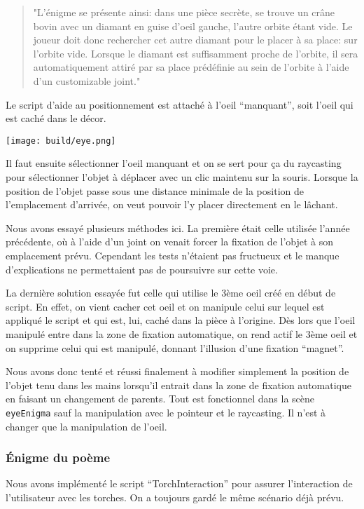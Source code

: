 \documentclass[12pt]{article}
\begin{document}
\begin{quote}
    "L’énigme se présente ainsi: dans une pièce secrète, se trouve un crâne bovin avec un diamant en guise d’oeil gauche, l’autre orbite étant vide. Le joueur doit donc rechercher cet autre diamant pour le placer à sa place: sur l’orbite vide. Lorsque le diamant est suffisamment proche de l’orbite, il sera automatiquement attiré par sa place prédéfinie au sein de l’orbite à l’aide d’un customizable joint."
\end{quote}

Le script d’aide au positionnement est attaché à l’oeil “manquant”, soit l’oeil qui est caché dans le décor.

\begin{center}
    \texttt{[image: build/eye.png]}
\end{center}

Il faut ensuite sélectionner l’oeil manquant et on se sert pour ça du raycasting pour sélectionner l’objet à déplacer avec un clic maintenu sur la souris. Lorsque la position de l’objet passe sous une distance minimale de la position de l'emplacement d’arrivée, on veut pouvoir l’y placer directement en le lâchant.

Nous avons essayé plusieurs méthodes ici. La première était celle utilisée l’année précédente, où à l’aide d’un joint on venait forcer la fixation de l’objet à son emplacement prévu. Cependant les tests n’étaient pas fructueux et le manque d’explications ne permettaient pas de poursuivre sur cette voie.

La dernière solution essayée fut celle qui utilise le 3ème oeil créé en début de script. En effet, on vient cacher cet oeil et on manipule celui sur lequel est appliqué le script et qui est, lui, caché dans la pièce à l’origine. Dès lors que l’oeil manipulé entre dans la zone de fixation automatique, on rend actif le 3ème oeil et on supprime celui qui est manipulé, donnant l’illusion d’une fixation “magnet”.

Nous avons donc tenté et réussi finalement à modifier simplement la position de l’objet tenu dans les mains lorsqu’il entrait dans la zone de fixation automatique en faisant un changement de parents. Tout est fonctionnel dans la scène \verb!eyeEnigma! sauf la manipulation avec le pointeur et le raycasting. Il n'est à changer que la manipulation de l'oeil. 

\subsubsection{Énigme du poème}
Nous avons implémenté le script “TorchInteraction” pour assurer l’interaction de l’utilisateur avec les torches. On a toujours gardé le même scénario déjà prévu.
\end{document}
